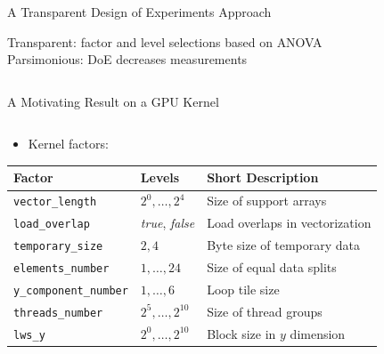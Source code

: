 \documentclass[11pt, compress, aspectratio=169, xcolor={table,usenames,dvipsnames}]{beamer}
\begin{document}
\begin{frame}
\begin{columns}
\begin{column}{0.86\columnwidth}
\begin{columns}
\begin{column}[t]{0.5\columnwidth}
\begin{block}{A Transparent Design of Experiments Approach}
\begin{center}
  {\normalsize
    \colorbox{WinterSkin}{\alert{\vphantom{g}Transparent}: {\small \alert{factor} and \alert{level} selections based on \alert{ANOVA}}} \\[0.2em]
    \colorbox{WinterSkin}{\alert{Parsimonious}: {\small DoE \alert{decreases measurements}}}
  }
\end{center}
\end{block}
\end{column}
\end{columns}
\begin{columns}
\begin{column}[t]{0.5\columnwidth}
\begin{block}{A Motivating Result on a GPU Kernel}
\begin{columns}
\begin{column}{0.49\columnwidth}
\begin{itemize}
\item Kernel \alert{factors}:
\end{itemize}
\vspace{0.6em}
\begin{table}[htbp]
\centering
\tiny
\begin{tabular}{llp{}}
\toprule
Factor & Levels & Short Description\\
\midrule
\texttt{vector\_length} & \(2^0,\dots,2^4\) & Size of support arrays\\
\texttt{load\_overlap} & \textit{true}, \textit{false} & Load overlaps in vectorization\\
\texttt{temporary\_size} & \(2,4\) & Byte size of temporary data\\
\texttt{elements\_number} & \(1,\dots,24\) & Size of equal data splits\\
\texttt{y\_component\_number} & \(1,\dots,6\) & Loop tile size\\
\texttt{threads\_number} & \(2^5,\dots,2^{10}\) & Size of thread groups\\
\texttt{lws\_y} & \(2^0,\dots,2^{10}\) & Block size in \(y\) dimension\\
\bottomrule
\end{tabular}
\end{table}
\end{column}


\end{columns}
\end{block}
\end{column}
\end{columns}
\end{column}
\end{columns}
\end{frame}
\end{document}
